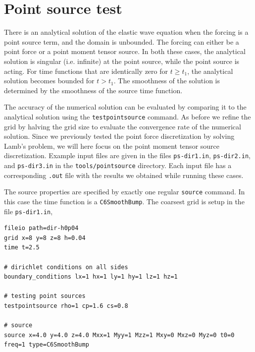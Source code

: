 \documentclass[11pt]{report}
\begin{document}

\section{Point source test}\label{sec:testpointsource}

There is an analytical solution of the elastic wave equation when the forcing is a point source
term, and the domain is unbounded. The forcing can either be a point force or a point moment tensor
source. In both these cases, the analytical solution is singular (i.e. infinite) at the point source,
while the point source is acting. For time functions that are identically zero for $t\geq t_1$, the
analytical solution becomes bounded for $t>t_1$. The smoothness of the solution is determined by the
smoothness of the source time function.

The accuracy of the numerical solution can be evaluated by comparing it to the analytical solution
using the \verb+testpointsource+ command. As before we refine the grid by halving the grid size to
evaluate the convergence rate of the numerical solution. Since we previously tested the point force
discretization by solving Lamb's problem, we will here focus on the point moment tensor source
discretization. Example input files are given in the files \verb+ps-dir1.in+, \verb+ps-dir2.in+,
and \verb+ps-dir3.in+ in the \verb+tools/pointsource+ directory. Each input file has a corresponding
\verb+.out+ file with the results we obtained while running these cases.

The source properties are specified by exactly one regular \verb+source+ command. In this case the
time function is a \verb+C6SmoothBump+. The coarsest grid is setup in the file \verb+ps-dir1.in+,
\begin{verbatim}
fileio path=dir-h0p04
grid x=8 y=8 z=8 h=0.04
time t=2.5

# dirichlet conditions on all sides
boundary_conditions lx=1 hx=1 ly=1 hy=1 lz=1 hz=1

# testing point sources
testpointsource rho=1 cp=1.6 cs=0.8

# source
source x=4.0 y=4.0 z=4.0 Mxx=1 Myy=1 Mzz=1 Mxy=0 Mxz=0 Myz=0 t0=0 freq=1 type=C6SmoothBump
\end{verbatim}
\end{document}
